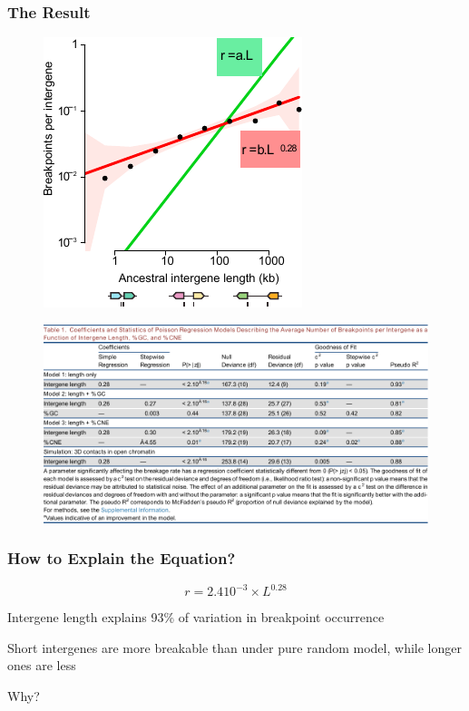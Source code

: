 \documentclass[svgnames,14pt]{beamer}
\begin{document}
\begin{frame}
\frametitle{The Result}
\begin{figure}
	\centering
	\includegraphics[scale = 1.5]{Plot.pdf}
\end{figure}
\end{frame}

\begin{frame}
\begin{figure}
	\centering
	\includegraphics[scale = .67]{Table11.pdf}
\end{figure}
\end{frame}

\begin{frame}
\frametitle{How to Explain the Equation?}
$$r = 2.4 10^{-3} \times L ^ {0.28}$$

Intergene length explains 93\% of variation in breakpoint occurrence
\vspace{12pt}

Short intergenes are more breakable than under pure random model,
while longer ones are less
\vspace{12pt}

Why?
\end{frame}
\end{document}
